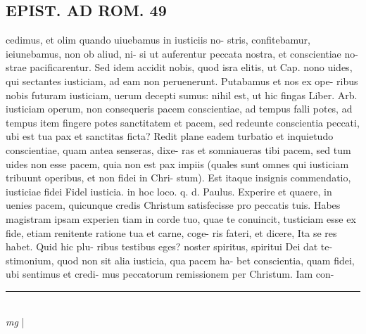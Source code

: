 \documentclass{article}
\begin{document}
\begin{pages}
\section*{EPIST. AD ROM.  49 }
\marginpar{[ p.]}\pstart cedimus, et olim quando uiuebamus in iusticiis no- stris, confitebamur, ieiunebamus, non ob aliud, ni- si ut auferentur peccata nostra, et conscientiae no- strae pacificarentur. Sed idem accidit nobis, quod isra elitis, ut Cap. nono uides, qui sectantes iusticiam, ad eam non peruenerunt. Putabamus et nos ex ope- ribus nobis futuram iusticiam, uerum decepti sumus: nihil est, ut hic fingas Liber. Arb. iusticiam operum, non consequeris pacem conscientiae, ad tempus falli potes, ad tempus item fingere potes sanctitatem et pacem, sed redeunte conscientia peccati, ubi est tua pax et sanctitas ficta? Redit plane eadem turbatio et inquietudo conscientiae, quam antea senseras, dixe- ras et somniaueras tibi pacem, sed tum uides non esse pacem, quia non est pax impiis (quales sunt omnes qui iusticiam tribuunt operibus, et non fidei in Chri- stum). Est itaque insignis commendatio, iusticiae fidei Fidel iusticia.  in hoc loco. q. d. Paulus. Experire et quaere, in uenies pacem, quicunque credis Christum satisfecisse pro peccatis tuis. Habes magistram ipsam experien tiam in corde tuo, quae te conuincit, tusticiam esse ex fide, etiam renitente ratione tua et carne, coge- ris fateri, et dicere, Ita se res habet. Quid hic plu- ribus testibus eges? noster spiritus, spiritui Dei dat te- stimonium, quod non sit alia iusticia, qua pacem ha- bet conscientia, quam fidei, ubi sentimus et credi- mus peccatorum remissionem per Christum. Iam con-  \pend
\vspace{0.5cm}\noindent
\vspace{0.2cm}\rule{1cm}{0.2pt}\\ 
\hspace{0.2cm}\textit{mg}
\footnotesize 
\normalsize| 

\end{pages}
\end{document}
